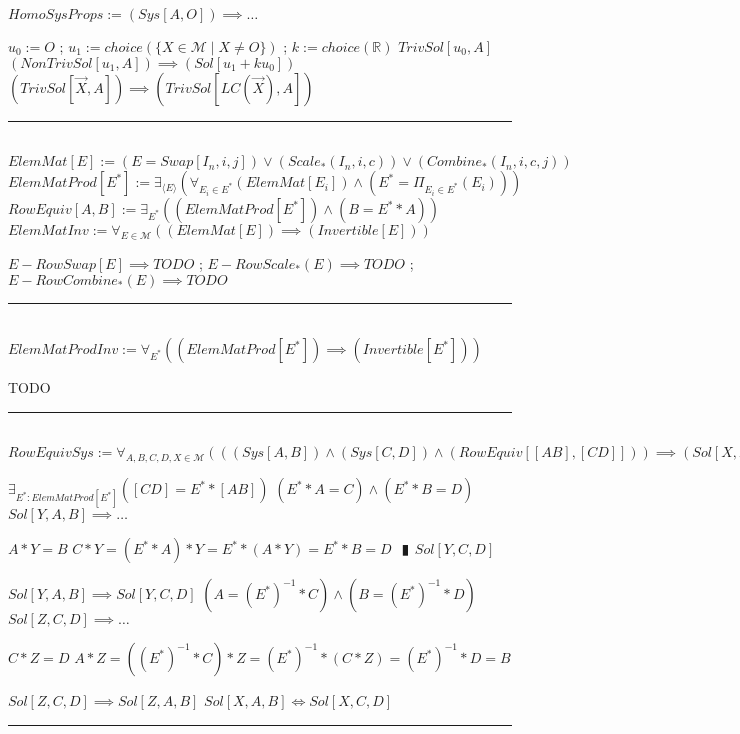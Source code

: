 \documentclass{book}
\newcommand{\abr}{:=}
\newcommand{\pipe}{$\phantom{(}\vrectangleblack\phantom{)}$}
\newcommand{\st}{\mathbin{|}}
\begin{document}
$HomoSysProps \abr (Sys[A, O]) \implies \ldots$
\begin{enumerate}
  \lit $u_0 \abr O$ ; $u_1 \abr choice(\{X \in \mathcal{M} \st X \neq O\})$ ; $k \abr choice(\mathbb{R})$
  \lit $TrivSol[u_0, A]$
  \lit $(NonTrivSol[u_1, A]) \implies (Sol[u_1 + k u_0])$
  \lit $(TrivSol[\overrightarrow{X}, A]) \implies (TrivSol[LC(\overrightarrow{X}), A])$
\end{enumerate} \vspace{.75mm} \hrule \vspace{.75mm} \ \\ 

$ElemMat[E] \abr (E = Swap[I_n, i, j]) \lor (Scale_*(I_n, i, c)) \lor (Combine_*(I_n, i, c, j))$ \\
$ElemMatProd[E^*] \abr \exists_{\langle E \rangle}(\forall_{E_i \in E^*}(ElemMat[E_i]) \land (E^* = \Pi_{E_i \in E^*}(E_i)))$ \\
$RowEquiv[A, B] \abr \exists_{E^*}((ElemMatProd[E^*]) \land (B = E^* * A))$ \\

$ElemMatInv \abr \forall_{E \in \mathcal{M}}((ElemMat[E]) \implies (Invertible[E]))$
\begin{enumerate}
  \lit $E-RowSwap[E] \implies TODO$ ; $E-RowScale_*(E) \implies TODO$ ; $E-RowCombine_*(E) \implies TODO$
\end{enumerate} \vspace{.75mm} \hrule \vspace{.75mm} \ \\ 

$ElemMatProdInv \abr \forall_{E^*}((ElemMatProd[E^*]) \implies (Invertible[E^*]))$
\begin{enumerate}
  \lit TODO
\end{enumerate} \vspace{.75mm} \hrule \vspace{.75mm} \ \\ 

$RowEquivSys \abr \forall_{A, B, C, D, X \in \mathcal{M}}(((Sys[A, B]) \land (Sys[C, D]) \land (RowEquiv[[A B], [C D]])) \implies (Sol[X, A, B] \iff Sol[X, C, D]))$
\begin{enumerate}
  \lit $\exists_{E^* : ElemMatProd[E^*]}([C D] = E^* * [A B])$
  \lit $(E^* * A = C) \land (E^* * B = D)$
  \lit $Sol[Y, A, B] \implies \ldots$
  \begin{enumerate}
    \lit $A * Y = B$
    \lit $C * Y = (E^* * A) * Y = E^* * (A * Y) = E^* * B = D$ \pipe $Sol[Y, C, D]$
  \end{enumerate}
  \lit $Sol[Y, A, B] \implies Sol[Y, C, D]$
  \lit $(A = (E^*)^{-1} * C) \land (B = (E^*)^{-1} * D)$
  \lit $Sol[Z, C, D] \implies \ldots$
  \begin{enumerate}
    \lit $C * Z = D$
    \lit $A * Z = ((E^*)^{-1} * C) * Z = (E^*)^{-1} * (C * Z) = (E^*)^{-1} * D = B$
  \end{enumerate}
  \lit $Sol[Z, C, D] \implies Sol[Z, A, B]$
  \lit $Sol[X, A, B] \iff Sol[X, C, D]$
\end{enumerate} \vspace{.75mm} \hrule \vspace{.75mm} \ \\ 
\end{document}
